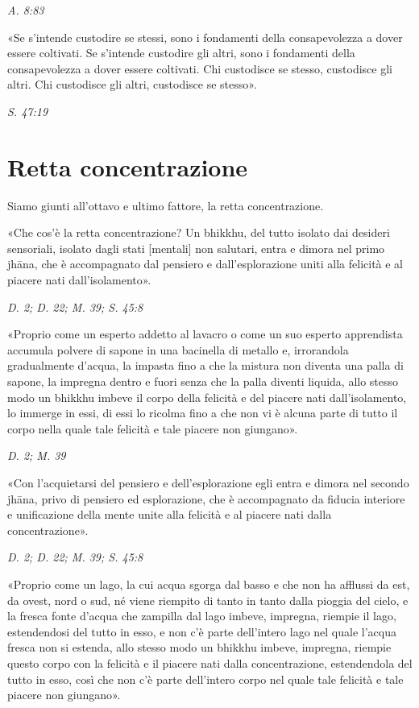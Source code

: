 \emph{A. 8:83}


«Se s’intende custodire se stessi, sono i fondamenti della
consapevolezza a dover essere coltivati. Se s’intende custodire gli
altri, sono i fondamenti della consapevolezza a dover essere coltivati.
Chi custodisce se stesso, custodisce gli altri. Chi custodisce gli
altri, custodisce se stesso».


\emph{S. 47:19}


\hypertarget{x-retta-concentrazione}{\section*{Retta concentrazione}}
 Siamo giunti all’ottavo e ultimo fattore, la retta
concentrazione.


 «Che cos’è la retta concentrazione? Un bhikkhu, del tutto
isolato dai desideri sensoriali, isolato dagli stati [mentali] non
salutari, entra e dimora nel primo jhāna, che è accompagnato dal
pensiero e dall’esplorazione uniti alla felicità e al piacere nati
dall’isolamento».


\emph{D. 2; D. 22; M. 39; S. 45:8}


«Proprio come un esperto addetto al lavacro o come un suo esperto
apprendista accumula polvere di sapone in una bacinella di metallo e,
irrorandola gradualmente d’acqua, la impasta fino a che la mistura non
diventa una palla di sapone, la impregna dentro e fuori senza che la
palla diventi liquida, allo stesso modo un bhikkhu imbeve il corpo della
felicità e del piacere nati dall’isolamento, lo immerge in essi, di essi
lo ricolma fino a che non vi è alcuna parte di tutto il corpo nella
quale tale felicità e tale piacere non giungano».


\emph{D. 2; M. 39}


«Con l’acquietarsi del pensiero e dell’esplorazione egli entra e dimora
nel secondo jhāna, privo di pensiero ed esplorazione, che è accompagnato
da fiducia interiore e unificazione della mente unite alla felicità e al
piacere nati dalla concentrazione».


\emph{D. 2; D. 22; M. 39; S. 45:8}


«Proprio come un lago, la cui acqua sgorga dal basso e che non ha
afflussi da est, da ovest, nord o sud, né viene riempito di tanto in
tanto dalla pioggia del cielo, e la fresca fonte d’acqua che zampilla
dal lago imbeve, impregna, riempie il lago, estendendosi del tutto in
esso, e non c’è parte dell’intero lago nel quale l’acqua fresca non si
estenda, allo stesso modo un bhikkhu imbeve, impregna, riempie questo
corpo con la felicità e il piacere nati dalla concentrazione,
estendendola del tutto in esso, così che non c’è parte dell’intero corpo
nel quale tale felicità e tale piacere non giungano».


